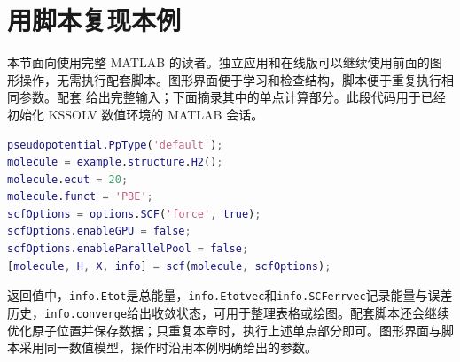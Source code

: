 \section{用脚本复现本例}

本节面向使用完整 MATLAB\regmark{} 的读者。独立应用和在线版可以继续使用前面的图形操作，无需执行配套脚本。图形界面便于学习和检查结构，脚本便于重复执行相同参数。配套  给出完整输入；下面摘录其中的单点计算部分。此段代码用于已经初始化 KSSOLV 数值环境的 MATLAB\regmark{} 会话。

\begin{lstlisting}[language=Matlab]
pseudopotential.PpType('default');
molecule = example.structure.H2();
molecule.ecut = 20;
molecule.funct = 'PBE';
scfOptions = options.SCF('force', true);
scfOptions.enableGPU = false;
scfOptions.enableParallelPool = false;
[molecule, H, X, info] = scf(molecule, scfOptions);
\end{lstlisting}

返回值中，\texttt{info.Etot}是总能量，\texttt{info.Etotvec}和\texttt{info.SCFerrvec}记录能量与误差历史，\texttt{info.converge}给出收敛状态，可用于整理表格或绘图。配套脚本还会继续优化原子位置并保存数据；只重复本章时，执行上述单点部分即可。图形界面与脚本采用同一数值模型，操作时沿用本例明确给出的参数。

